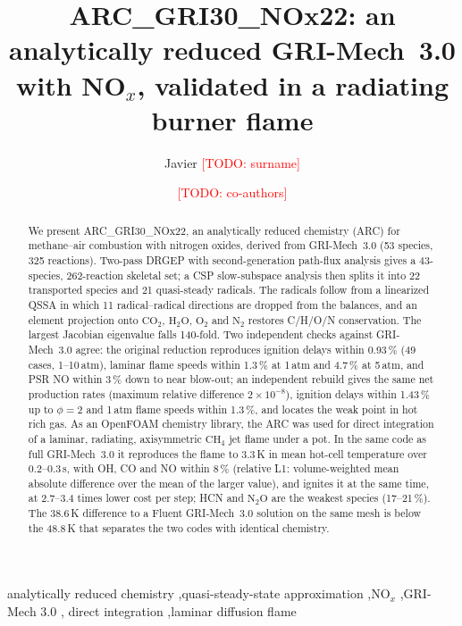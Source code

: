 \documentclass[preprint,review,12pt]{elsarticle}
\providecommand{\todo}[1]{}
\renewcommand{\todo}[1]{\textcolor{red}{[TODO: #1]}}
\newcommand{\ce}[1]{\ensuremath{\mathrm{#1}}}
\begin{document}
\sloppy
\begin{frontmatter}

\title{ARC\_GRI30\_NOx22: an analytically reduced GRI-Mech~3.0 with NO$_x$, validated in a radiating burner flame}

\author[a]{Javier \todo{surname}}
\author[a]{\todo{co-authors}}
\address[a]{\todo{affiliation}}

\begin{abstract}
We present ARC\_GRI30\_NOx22, an analytically reduced chemistry (ARC) for methane--air combustion with nitrogen
oxides, derived from GRI-Mech~3.0 (53 species, 325 reactions). Two-pass DRGEP with second-generation path-flux
analysis gives a 43-species, 262-reaction skeletal set; a CSP slow-subspace analysis then splits it into 22
transported species and 21 quasi-steady radicals. The radicals follow from a linearized QSSA in which 11
radical--radical directions are dropped from the balances, and an element projection onto \ce{CO_{2}}, \ce{H_{2}O},
\ce{O_{2}} and \ce{N_{2}} restores C/H/O/N conservation. The largest Jacobian eigenvalue falls 140-fold. Two independent
checks against GRI-Mech~3.0 agree: the original reduction reproduces ignition delays within 0.93\,\% (49 cases,
1--10\,atm), laminar flame speeds within 1.3\,\% at 1\,atm and 4.7\,\% at 5\,atm, and PSR NO within 3\,\% down to
near blow-out; an independent rebuild gives the same net production rates (maximum relative difference $2\times10^{-8}$), ignition delays within
1.43\,\% up to $\phi=2$ and 1\,atm flame speeds within 1.3\,\%, and locates the weak point in hot rich gas. As an
OpenFOAM chemistry library, the ARC was used for direct integration of a laminar, radiating, axisymmetric \ce{CH_{4}}
jet flame under a pot. In the same code as full GRI-Mech~3.0 it reproduces the flame to 3.3\,K in mean hot-cell
temperature over 0.2--0.3\,s, with OH, CO and NO within 8\,\% (relative L1: volume-weighted mean absolute difference over the mean of the larger value), and ignites it at the same time, at 2.7--3.4 times lower
cost per step; HCN and \ce{N_{2}O} are the weakest species (17--21\,\%). The 38.6\,K difference to a Fluent GRI-Mech~3.0
solution on the same mesh is below the 48.8\,K that separates the two codes with identical chemistry.
\end{abstract}

\begin{keyword}
analytically reduced chemistry \sep quasi-steady-state approximation \sep NO$_x$ \sep GRI-Mech 3.0 \sep
direct integration \sep laminar diffusion flame
\end{keyword}
\end{frontmatter}
\end{document}

